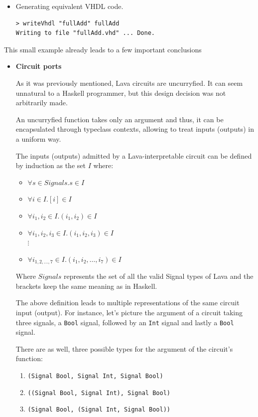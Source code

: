 \documentclass[a4paper,twoside,11pt]{article}
\begin{document}
\begin{body}
\begin{itemize}
\item Generating equivalent VHDL code.

\begin{verbatim}
> writeVhdl "fullAdd" fullAdd
Writing to file "fullAdd.vhd" ... Done.
\end{verbatim}

\end{itemize}

This small example already leads to a few important conclusions

\begin{itemize}
  \item \textbf{Circuit ports}
    
    As it was previously mentioned, Lava circuits are uncurryfied.  It
    can seem unnatural to a Haskell programmer, but this design
    decision was not arbitrarily made. 
    
    An uncurryfied function takes only an argument and thus, it 
    can be encapsulated through typeclass contexts, allowing to treat
    inputs (outputs) in a uniform way.

    The inputs (outputs) admitted by a Lava-interpretable circuit
    can be defined by induction as the set $I$ where:
    
    \begin{itemize}
    \item $\forall s \in Signals . s  \in I$
    \item $\forall i \in I . [i] \in I$
    \item $\forall i_1,i_2 \in I . (i_1,i_2) \in I$
    \item $\forall i_1,i_2,i_3 \in I . (i_1,i_2,i_3) \in I$\\
      $\vdots$
    \item $\forall i_{1,2,\dots,7} \in I . (i_1,i_2,\dots,i_7) \in I$
    \end{itemize}
    
    Where $Signals$ represents the set of all the valid Signal types
    of Lava and the brackets keep the same meaning as in Haskell.
    
    The above definition leads to multiple representations of the same
    circuit input (output).  For instance, let's picture the argument of a
    circuit taking three signals, a \texttt{Bool} signal, followed by
    an \texttt{Int} signal and lastly a \texttt{Bool} signal.
    
    There are as well, three possible types for the argument
    of the circuit's function: 
    \begin{enumerate}[1)]
      \item \texttt{(Signal Bool, Signal Int, Signal Bool)}
      \item \texttt{((Signal Bool, Signal Int), Signal Bool)}
      \item \texttt{(Signal Bool, (Signal Int, Signal Bool))}
    \end{enumerate}
    

\end{itemize}
\end{body}
\end{document}
